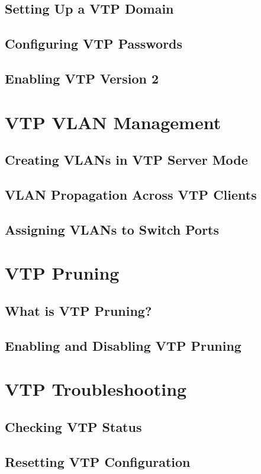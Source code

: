\documentclass{book}
\begin{document}
\subsection{Setting Up a VTP Domain}
\subsection{Configuring VTP Passwords}
\subsection{Enabling VTP Version 2}

\section{VTP VLAN Management}
\subsection{Creating VLANs in VTP Server Mode}
\subsection{VLAN Propagation Across VTP Clients}
\subsection{Assigning VLANs to Switch Ports}

\section{VTP Pruning}
\subsection{What is VTP Pruning?}
\subsection{Enabling and Disabling VTP Pruning}

\section{VTP Troubleshooting}
\subsection{Checking VTP Status}
\subsection{Resetting VTP Configuration}
\end{document}
